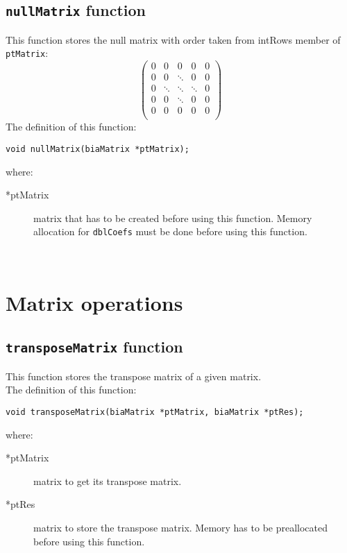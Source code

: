 \subsection{\texttt{nullMatrix} function}

This function stores the null matrix with order taken from intRows member of \texttt{ptMatrix}:
%
\begin{displaymath}
  \left( \begin{array}{ccccc}
    0 & 0 & 0 & 0 & 0 \\
    0 & 0 & \ddots & 0 & 0 \\
    0 & \ddots & \ddots & \ddots & 0 \\
    0 & 0 & \ddots & 0 & 0 \\
    0 & 0 & 0 & 0 & 0 \\
  \end{array} \right)
\end{displaymath}
%
The definition of this function:
%
\begin{verbatim}
void nullMatrix(biaMatrix *ptMatrix);  
\end{verbatim}
%
where:
%
\begin{description}
\item[*ptMatrix] matrix that has to be created before using this function. Memory allocation for \texttt{dblCoefs} must be done before using this function.
\end{description}
%
\ \\
%

\section{Matrix operations}

\subsection{\texttt{transposeMatrix} function}

This function stores the transpose matrix of a given matrix.\\
%
The definition of this function:
%
\begin{verbatim}
void transposeMatrix(biaMatrix *ptMatrix, biaMatrix *ptRes);  
\end{verbatim}
%
where:
%
\begin{description}
\item[*ptMatrix] matrix to get its transpose matrix.
\item[*ptRes] matrix to store the transpose matrix. Memory has to be preallocated before using this function.
\end{description}
%
\ \\
%

